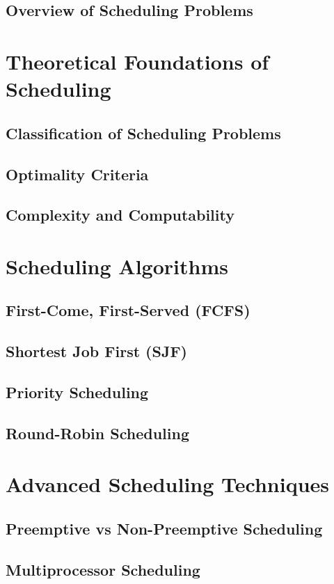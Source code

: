 \documentclass[12pt]{book} %
\begin{document}
\subsection{Overview of Scheduling Problems}

\section{Theoretical Foundations of Scheduling}
\subsection{Classification of Scheduling Problems}
\subsection{Optimality Criteria}
\subsection{Complexity and Computability}

\section{Scheduling Algorithms}
\subsection{First-Come, First-Served (FCFS)}
\subsection{Shortest Job First (SJF)}
\subsection{Priority Scheduling}
\subsection{Round-Robin Scheduling}

\section{Advanced Scheduling Techniques}
\subsection{Preemptive vs Non-Preemptive Scheduling}
\subsection{Multiprocessor Scheduling}
\end{document}
